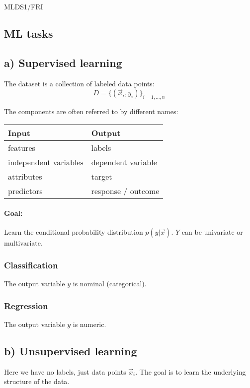 \documentclass{article}
\begin{document}
\begin{center}
	{\small MLDS1/FRI \par}
\end{center}


\begin{multicols}{2}
\section{ML tasks}

\subsection{a) Supervised learning}
The dataset is a collection of labeled data points: 
$$ D = \{(\vec{x}_i, y_i)\}_{i=1,...,n} $$

The components are often referred to by different names: 
\begin{table}[h!]
\centering
\begin{tabular}{|l|l|}
\hline
\textbf{Input} & \textbf{Output} \\
\hline
features & labels \\
independent variables & dependent variable \\
attributes & target \\
predictors & response / outcome \\
\hline
\end{tabular}
\end{table}

\paragraph{Goal:} Learn the conditional probability distribution $p(y|\vec{x})$. 
$Y$ can be univariate or multivariate. 

\subsubsection{Classification}
The output variable $y$ is nominal (categorical). 

\subsubsection{Regression}
The output variable $y$ is numeric. 

\subsection{b) Unsupervised learning}
Here we have no labels, just data points $\vec{x}_i$. The goal is to learn the underlying structure of the data. 


\end{multicols}
\end{document}
